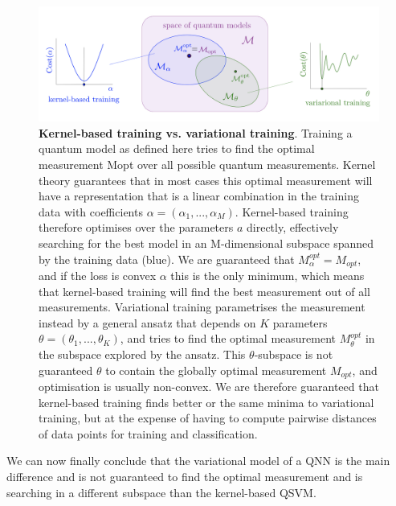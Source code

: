 \begin{figure}[!h]
    \centering
    \includegraphics[width=1.0\textwidth]{thesis/Figures/qnn/2101.11020_Maria_Schuld_Fig.5.png} 
    \caption{\textbf{Kernel-based training vs. variational training}. Training a quantum model as defined here tries to find the optimal measurement Mopt over all possible quantum measurements. Kernel theory guarantees that in most cases this optimal measurement will have a representation that is a linear combination in the training data with coefficients $\alpha = (\alpha_1,...,\alpha_M)$. Kernel-based training therefore optimises over the parameters $a$ directly, effectively searching for the best model in an M-dimensional subspace spanned by the training data (blue). We are guaranteed that $M_{\alpha}^{opt} = M_{opt}$, and if the loss is convex $\alpha$ this is the only minimum, which means that kernel-based training will find the best measurement out of all measurements. Variational training parametrises the measurement instead by a general ansatz that depends on $K$ parameters $\theta = (\theta_1,...,\theta_K)$, and tries to find the optimal measurement $M_{\theta}^{opt}$ in the subspace explored by the ansatz. This $\theta$-subspace is not guaranteed $\theta$ to contain the globally optimal measurement $M_{opt}$, and optimisation is usually non-convex. We are therefore guaranteed that kernel-based training finds better or the same minima to variational training, but at the expense of having to compute pairwise distances of data points for training and classification.\cite{schuld_SQMLmodelsAreKernelMethods}}
    \label{figure:2101.11020_Maria_Schuld_Fig.5}
\end{figure}

We can now finally conclude that the variational model of a QNN is the main difference and is not guaranteed to find the optimal measurement and is searching in a different subspace than the kernel-based QSVM. 

